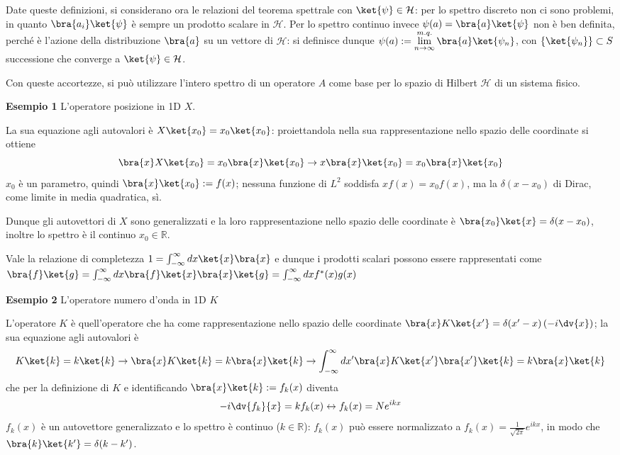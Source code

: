 Date queste definizioni, si considerano ora le relazioni del teorema spettrale con
$ \ket{\psi}\in\mathcal{H}$: per lo spettro discreto non ci sono problemi, in quanto
$ \bra{a_i}\ket{\psi} $ è sempre un prodotto scalare in $ \mathcal{H} $. Per lo spettro
continuo invece $ \psi(a) = \bra{a}\ket{\psi} $ non è ben definita, perché è l'azione
della distribuzione $ \bra{a} $ su un vettore di $ \mathcal{H} $: si definisce dunque
$ \psi(a):=\lim\limits_{n\to\infty}^{m.q.}\bra{a}\ket{\psi_n} $, con
$ \left\{ \ket{\psi_n} \right\} \subset S$ successione che converge a
$ \ket{\psi}\in\mathcal{H} $.

Con queste accortezze, si può utilizzare l'intero spettro di un operatore $ A $ come base
per lo spazio di Hilbert $ \mathcal{H} $ di un sistema fisico.

\textbf{Esempio 1} L'operatore posizione in 1D $ X $.

La sua equazione agli autovalori è $ X\ket{x_0} = x_0\ket{x_0} $: proiettandola nella 
sua rappresentazione nello spazio delle coordinate si ottiene
$$ \bra{x}X\ket{x_0} = x_0\bra{x}\ket{x_0} \to x\bra{x}\ket{x_0} = x_0\bra{x}\ket{x_0} $$
$ x_0 $ è un parametro, quindi $ \bra{x}\ket{x_0} := f(x) $; nessuna funzione di $ L^2 $
soddisfa $ xf(x) = x_0f(x) $, ma la $\delta(x-x_0)$ di Dirac, come limite in media quadratica,
sì.

Dunque gli autovettori di $X$ sono generalizzati e la loro rappresentazione nello spazio delle
coordinate è $ \bra{x_0}\ket{x} = \delta(x-x_0) $,
inoltre lo spettro è il continuo $ x_0\in\mathbb{R} $. 

Vale la relazione di completezza $ 1=\int_{-\infty}^{\infty}dx\ket{x}\bra{x} $ e dunque
i prodotti scalari possono essere rappresentati come
$ \bra{f}\ket{g} = \int_{-\infty}^{\infty}dx \bra{f}\ket{x}\bra{x}\ket{g} =
\int_{-\infty}^{\infty}dxf^*(x)g(x)$ 

\textbf{Esempio 2} L'operatore numero d'onda in 1D $ K $ 

L'operatore $ K $ è quell'operatore che ha come rappresentazione nello spazio delle coordinate
$ \bra{x}K\ket{x'} = \delta(x'-x)\left( -i\dv{x} \right) $; la sua equazione agli autovalori è
$$ K\ket{k} = k\ket{k} \to \bra{x}K\ket{k} = k\bra{x}\ket{k} \to
\int_{-\infty}^{\infty}dx'\bra{x}K\ket{x'}\bra{x'}\ket{k} = k\bra{x}\ket{k} $$
che per la definizione di $ K $ e identificando $ \bra{x}\ket{k} := f_k(x) $ diventa
$$ -i\dv{f_k}{x} = kf_k(x) \leftrightarrow f_k(x) = N e^{ikx}$$
$ f_k(x) $ è un autovettore generalizzato e lo spettro è continuo ($ k\in\mathbb{R} $): 
$ f_k(x) $ può essere normalizzato a
$ f_k(x) = \frac{1}{\sqrt{2\pi}}e^{ikx} $, in modo che $ \bra{k}\ket{k'} = \delta(k-k') $. 

